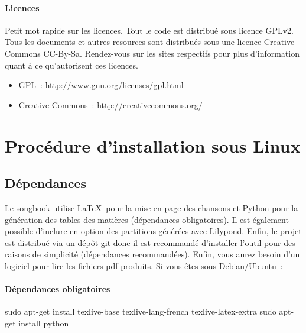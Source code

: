 \documentclass[online]{patacrep}
\begin{document}
\paragraph{Licences}
Petit mot rapide sur les licences. Tout le code est distribué sous
licence GPLv2. Tous les documents et autres resources sont distribués
sous une licence Creative Commons CC-By-Sa. Rendez-vous sur les sites
respectifs pour plus d'information quant à ce qu'autorisent ces
licences.
\begin{itemize}
\item GPL~: \url{http://www.gnu.org/licenses/gpl.html}
\item Creative Commons~: \url{http://creativecommons.org/}
\end{itemize}


\section{Procédure d'installation sous Linux}

\subsection{Dépendances}
\label{sec:songbook-dep}

Le songbook utilise \LaTeX\, pour la mise en page des chansons et
Python pour la génération des tables des matières (dépendances
obligatoires).  Il est également possible d'inclure en option des
partitions générées avec Lilypond. Enfin, le projet est distribué via
un dépôt git donc il est recommandé d'installer l'outil pour des
raisons de simplicité (dépendances recommandées). Enfin, vous aurez
besoin d'un logiciel pour lire les fichiers pdf produits. Si vous êtes
sous Debian/Ubuntu~:

\paragraph{Dépendances obligatoires}
\begin{unixcom}
  sudo apt-get install texlive-base texlive-lang-french texlive-latex-extra
  sudo apt-get install python
\end{unixcom}
\end{document}
